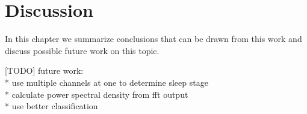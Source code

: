 \chapter{Discussion}
\label{chapter:discussion}

In this chapter we summarize conclusions that can be drawn from this work and discuss possible future work on this topic.



[TODO]
\newline
\newline
future work:\\
* use multiple channels at one to determine sleep stage\\
* calculate power spectral density from fft output\\
* use better classification